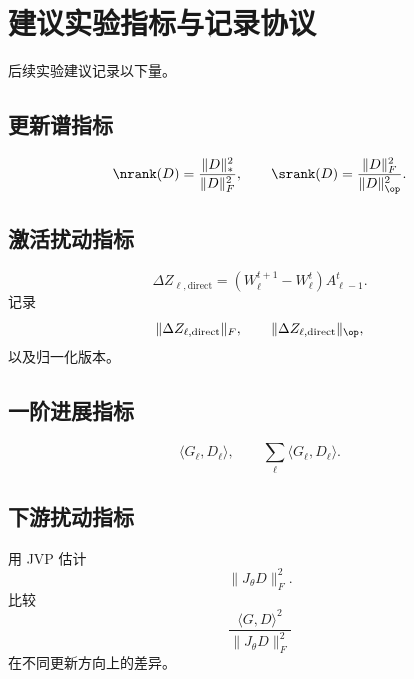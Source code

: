 \section{建议实验指标与记录协议}

后续实验建议记录以下量。

\subsection{更新谱指标}
\[
\nrank(D)=\frac{\|D\|_*^2}{\|D\|_F^2},
\qquad
\srank(D)=\frac{\|D\|_F^2}{\|D\|_{\op}^2}.
\]

\subsection{激活扰动指标}
\[
\Delta Z_{\ell,\mathrm{direct}}=(W_\ell^{t+1}-W_\ell^t)A_{\ell-1}^t.
\]
记录
\[
\|\Delta Z_{\ell,\mathrm{direct}}\|_F,
\qquad
\|\Delta Z_{\ell,\mathrm{direct}}\|_{\op},
\]
以及归一化版本。

\subsection{一阶进展指标}
\[
\langle G_\ell,D_\ell\rangle,
\qquad
\sum_\ell\langle G_\ell,D_\ell\rangle.
\]

\subsection{下游扰动指标}
用 JVP 估计
\[
\|J_\theta D\|_F^2.
\]
比较
\[
\frac{\langle G,D\rangle^2}{\|J_\theta D\|_F^2}
\]
在不同更新方向上的差异。
